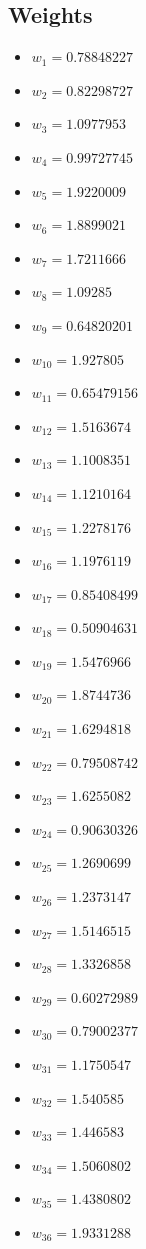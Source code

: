 \documentclass[11pt]{article}
\begin{document}
\subsection*{Weights}
\begin{itemize}
\item $w_{1} = 0.78848227$
\item $w_{2} = 0.82298727$
\item $w_{3} = 1.0977953$
\item $w_{4} = 0.99727745$
\item $w_{5} = 1.9220009$
\item $w_{6} = 1.8899021$
\item $w_{7} = 1.7211666$
\item $w_{8} = 1.09285$
\item $w_{9} = 0.64820201$
\item $w_{10} = 1.927805$
\item $w_{11} = 0.65479156$
\item $w_{12} = 1.5163674$
\item $w_{13} = 1.1008351$
\item $w_{14} = 1.1210164$
\item $w_{15} = 1.2278176$
\item $w_{16} = 1.1976119$
\item $w_{17} = 0.85408499$
\item $w_{18} = 0.50904631$
\item $w_{19} = 1.5476966$
\item $w_{20} = 1.8744736$
\item $w_{21} = 1.6294818$
\item $w_{22} = 0.79508742$
\item $w_{23} = 1.6255082$
\item $w_{24} = 0.90630326$
\item $w_{25} = 1.2690699$
\item $w_{26} = 1.2373147$
\item $w_{27} = 1.5146515$
\item $w_{28} = 1.3326858$
\item $w_{29} = 0.60272989$
\item $w_{30} = 0.79002377$
\item $w_{31} = 1.1750547$
\item $w_{32} = 1.540585$
\item $w_{33} = 1.446583$
\item $w_{34} = 1.5060802$
\item $w_{35} = 1.4380802$
\item $w_{36} = 1.9331288$

\end{itemize}
\end{document}
